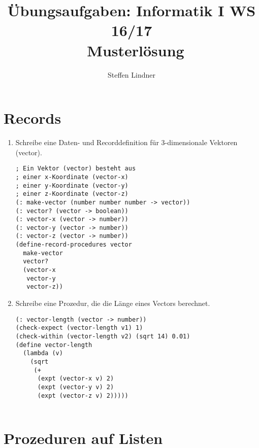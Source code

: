 \documentclass[11pt]{article}
\title{Übungsaufgaben: Informatik I WS 16/17 \\ Musterlösung}
\author{Steffen Lindner}
\begin{document}
\maketitle

\section{Records}

\begin{enumerate}
	\item Schreibe eine Daten- und Recorddefinition für 3-dimensionale Vektoren (vector).
	
	
	\begin{lstlisting}
; Ein Vektor (vector) besteht aus
; einer x-Koordinate (vector-x)
; einer y-Koordinate (vector-y)
; einer z-Koordinate (vector-z)
(: make-vector (number number number -> vector))
(: vector? (vector -> boolean))
(: vector-x (vector -> number))
(: vector-y (vector -> number))
(: vector-z (vector -> number))
(define-record-procedures vector
  make-vector
  vector?
  (vector-x
   vector-y
   vector-z))	
	\end{lstlisting}

	\item Schreibe eine Prozedur, die die Länge eines Vectors berechnet.
	
	
	\begin{lstlisting}
(: vector-length (vector -> number))
(check-expect (vector-length v1) 1)
(check-within (vector-length v2) (sqrt 14) 0.01)
(define vector-length
  (lambda (v)
    (sqrt
     (+
      (expt (vector-x v) 2)
      (expt (vector-y v) 2)
      (expt (vector-z v) 2)))))
	
	\end{lstlisting}

\end{enumerate}

\section{Prozeduren auf Listen}
\end{document}
